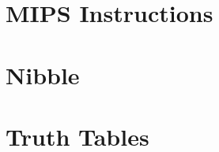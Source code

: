 \documentclass{article}
\begin{document}
\thispagestyle{empty}

\null
\vfill

\begin{minipage}[t]{\linewidth}
    \section*{MIPS Instructions}
    
\end{minipage}

\vfill
\vfill

\begin{minipage}[t]{0.3\linewidth}
    \section*{Nibble}
    \centering
    
\end{minipage}
\hfill
\begin{minipage}[t]{0.68\linewidth}
    \section*{Truth Tables}
    
\end{minipage}

\vfill
\end{document}
